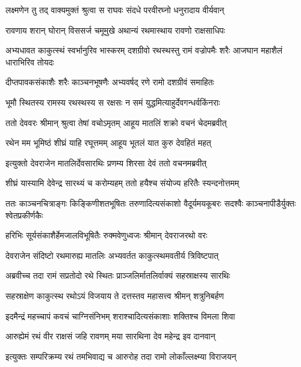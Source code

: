 
\twolineshloka
{लक्ष्मणेन तु तद् वाक्यमुक्तं श्रुत्वा स राघवः}
{संदधे परवीरघ्नो धनुरादाय वीर्यवान्} %

\twolineshloka
{रावणाय शरान् घोरान् विससर्ज चमूमुखे}
{अथान्यं रथमास्थाय रावणो राक्षसाधिपः} %

\threelineshloka
{अभ्यधावत काकुत्स्थं स्वर्भानुरिव भास्करम्}
{दशग्रीवो रथस्थस्तु रामं वज्रोपमैः शरैः}
{आजघान महाशैलं धाराभिरिव तोयदः} %

\twolineshloka
{दीप्तपावकसंकाशैः शरैः काञ्चनभूषणैः}
{अभ्यवर्षद् रणे रामो दशग्रीवं समाहितः} %

\twolineshloka
{भूमौ स्थितस्य रामस्य रथस्थस्य स रक्षसः}
{न समं युद्धमित्याहुर्देवगन्धर्वकिंनराः} %

\twolineshloka
{ततो देववरः श्रीमान् श्रुत्वा तेषां वचोऽमृतम्}
{आहूय मातलिं शक्रो वचनं चेदमब्रवीत्} %

\twolineshloka
{रथेन मम भूमिष्ठं शीघ्रं याहि रघूत्तमम्}
{आहूय भूतलं यात कुरु देवहितं महत्} %

\twolineshloka
{इत्युक्तो देवराजेन मातलिर्देवसारथिः}
{प्रणम्य शिरसा देवं ततो वचनमब्रवीत्} %

\twolineshloka
{शीघ्रं यास्यामि देवेन्द्र सारथ्यं च करोम्यहम्}
{ततो हयैश्च संयोज्य हरितैः स्यन्दनोत्तमम्} %

\threelineshloka
{ततः काञ्चनचित्राङ्गः किङ्किणीशतभूषितः}
{तरुणादित्यसंकाशो वैदूर्यमयकूबरः}
{सदश्वैः काञ्चनापीडैर्युक्तः श्वेतप्रकीर्णकैः} %

\twolineshloka
{हरिभिः सूर्यसंकाशैर्हेमजालविभूषितैः}
{रुक्मवेणुध्वजः श्रीमान् देवराजरथो वरः} %

\twolineshloka
{देवराजेन संदिष्टो रथमारुह्य मातलिः}
{अभ्यवर्तत काकुत्स्थमवतीर्य त्रिविष्टपात्} %

\twolineshloka
{अब्रवीच्च तदा रामं सप्रतोदो रथे स्थितः}
{प्राञ्जलिर्मातलिर्वाक्यं सहस्राक्षस्य सारथिः} %

\twolineshloka
{सहस्राक्षेण काकुत्स्थ रथोऽयं विजयाय ते}
{दत्तस्तव महासत्त्व श्रीमन् शत्रुनिबर्हण} %

\twolineshloka
{इदमैन्द्रं महच्चापं कवचं चाग्निसंनिभम्}
{शराश्चादित्यसंकाशाः शक्तिश्च विमला शिवा} %

\twolineshloka
{आरुह्येमं रथं वीर राक्षसं जहि रावणम्}
{मया सारथिना देव महेन्द्र इव दानवान्} %

\twolineshloka
{इत्युक्तः सम्परिक्रम्य रथं तमभिवाद्य च}
{आरुरोह तदा रामो लोकाँल्लक्ष्म्या विराजयन्} %

